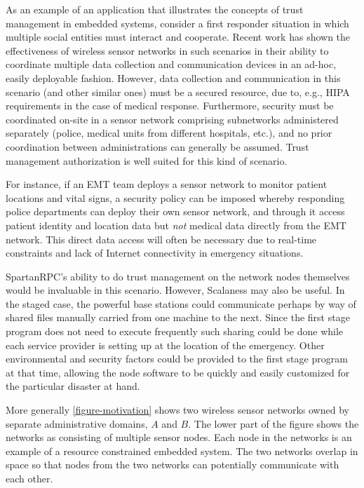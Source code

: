 As an example of an application that illustrates the concepts of trust management in embedded
systems, consider a first responder situation in which multiple social entities must interact
and cooperate. Recent work has shown the effectiveness of wireless sensor networks in such
scenarios \cite{citeulike:4460555,1038146} in their ability to coordinate multiple data
collection and communication devices in an ad-hoc, easily deployable fashion. However, data
collection and communication in this scenario (and other similar ones) must be a secured
resource, due to, e.g., HIPA requirements in the case of medical response. Furthermore, security
must be coordinated on-site in a sensor network comprising subnetworks administered separately
(police, medical units from different hospitals, etc.), and no prior coordination between
administrations can generally be assumed. Trust management authorization is well suited for this
kind of scenario.

For instance, if an EMT team deploys a sensor network to monitor patient locations and vital
signs, a security policy can be imposed whereby responding police departments can deploy their
own sensor network, and through it access patient identity and location data but \emph{not}
medical data directly from the EMT network. This direct data access will often be necessary due
to real-time constraints and lack of Internet connectivity in emergency situations.

SpartanRPC's ability to do trust management on the network nodes themselves would be invaluable
in this scenario. However, Scalaness may also be useful. In the staged case, the powerful base
stations could communicate perhaps by way of shared files manually carried from one machine to
the next. Since the first stage program does not need to execute frequently such sharing could
be done while each service provider is setting up at the location of the emergency. Other
environmental and security factors could be provided to the first stage program at that time,
allowing the node software to be quickly and easily customized for the particular disaster at
hand.


More generally \autoref{figure-motivation} shows two wireless sensor networks owned by separate
administrative domains, $A$ and $B$. The lower part of the figure shows the networks as
consisting of multiple sensor nodes. Each node in the networks is an example of a resource
constrained embedded system. The two networks overlap in space so that nodes from the two
networks can potentially communicate with each other.

